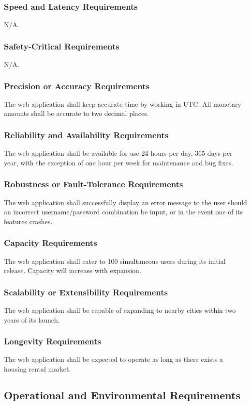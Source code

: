 \documentclass[12pt]{article}
\begin{document}
{{{{{{{\subsubsection{Speed and Latency Requirements}
N/A.
\subsubsection{Safety-Critical Requirements}
N/A.
\subsubsection{Precision or Accuracy Requirements}
The web application shall keep accurate time by working in UTC. All monetary 
amounts shall be accurate to two decimal places. 
\subsubsection{Reliability and Availability Requirements}
The web application shall be available for use 24 hours per day, 365 days per 
year, with the exception of one hour per week for maintenance and bug fixes.
\subsubsection{Robustness or Fault-Tolerance Requirements}
The web application shall successfully display an error message to the user 
should an incorrect username/password combination be input, or in the event one of its features crashes.
\subsubsection{Capacity Requirements}
The web application shall cater to 100 simultaneous users during its initial release. Capacity will increase with expansion.
\subsubsection{Scalability or Extensibility Requirements}
The web application shall be capable of expanding to nearby cities within two 
years of its launch.
\subsubsection{Longevity Requirements}
The web application shall be expected to operate as long as there exists a 
housing rental market.
\subsection{Operational and Environmental Requirements}
}}}}}}}
\end{document}
